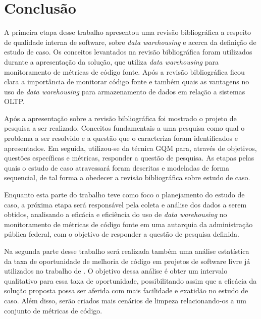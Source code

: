 \chapter{Conclusão}

A primeira etapa desse trabalho apresentou uma revisão bibliográfica a respeito de qualidade interna de software, sobre \textit{data warehousing} e acerca da definição de estudo de caso. Os conceitos levantados na revisão bibliográfica foram utilizados durante a apresentação da solução, que utiliza \textit{data warehousing} para monitoramento de métricas de código fonte. Após a revisão bibliográfica ficou clara a importância de monitorar código fonte e também quais as vantagens no uso de \textit{data warehousing} para armazenamento de dados em relação a sistemas OLTP. 

Após a apresentação sobre a revisão bibliográfica foi mostrado o projeto de pesquisa a ser realizado. Conceitos fundamentais a uma pesquisa como qual o problema a ser resolvido e a questão que o caracteriza foram identificados e apresentados. Em seguida, utilizou-se da  técnica GQM para, através de objetivos, questões específicas e métricas, responder a questão de pesquisa. As etapas pelas quais o estudo de caso atravessará foram descritas e modeladas de forma sequencial, de tal forma a obedecer a revisão bibliográfica sobre estudo de caso.

Enquanto esta parte do trabalho teve como foco o planejamento do estudo de caso, a próxima etapa será responsável pela coleta e análise dos dados a serem obtidos, analisando a eficácia e eficiência do uso de \textit{data warehousing} no monitoramento de métricas de código fonte em uma autarquia da administração pública federal, com o objetivo de responder a questão de pesquisa definida.

Na segunda parte desse trabalho será realizada também uma análise estatística da taxa de oportunidade de melhoria de código em projetos de software livre já utilizados no trabalho de \cite{Meirelles2013}. O objetivo dessa análise é obter um intervalo qualitativo para essa taxa de oportunidade, possibilitando assim que a eficácia da solução proposta possa ser aferida com mais facilidade e exatidão no estudo de caso. Além disso, serão criados mais cenários de limpeza relacionando-os a um conjunto de métricas de código.